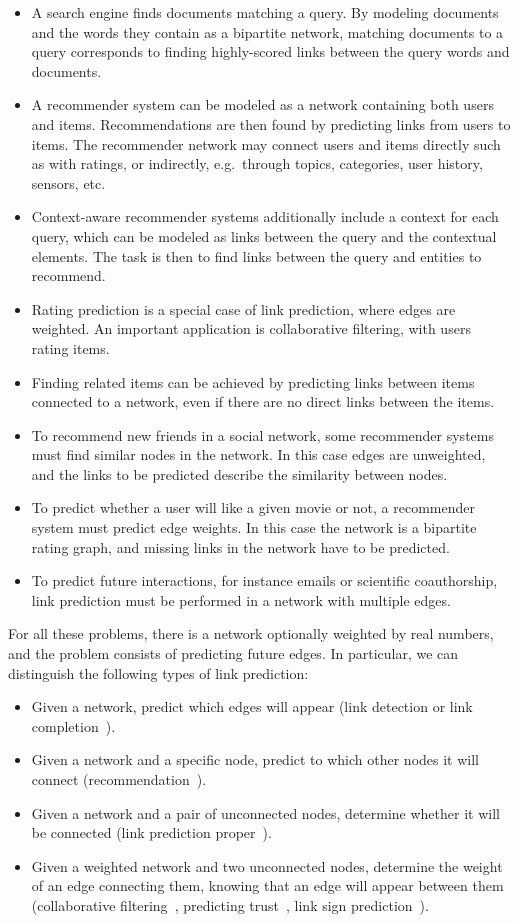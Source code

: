 \documentclass[11pt,a4paper]{book}
\begin{document}
\begin{itemize}
\item A search engine finds documents matching a query.  By modeling
  documents and the words they contain as a bipartite network, 
  matching documents to a query corresponds to finding highly-scored
  links between the query words and documents. 
\item A recommender system can be modeled as a network containing both
  users and items.  Recommendations are then found by predicting links
  from users to items.  The recommender network may connect users and
  items directly such as with ratings, or indirectly, e.g.\ through
  topics, categories, user history, sensors, etc.  
\item Context-aware recommender systems additionally include a context
  for each query, which can be modeled as links between the query and
  the contextual elements.  The task is then to find links between the
  query and entities to recommend. 
\item Rating prediction is a special case of link prediction, where
  edges are weighted.  An important application is collaborative
  filtering, with users rating items. 
\item Finding related items can be achieved by predicting links between items
  connected to a network, even if there are no direct links between the
  items. 
\item To recommend new friends in a social network, some recommender
  systems must find similar nodes in the network. 
  In this case edges are unweighted, and the links
  to be predicted describe the similarity between nodes. 
\item To predict whether a user will like a given movie or not, 
  a recommender system must predict edge weights.
  In this case the network is a bipartite
  rating graph, and missing links in the network have to be predicted. 
\item To predict future interactions, for instance emails or scientific
  coauthorship, link prediction must be performed in a
  network with multiple edges. 
\end{itemize}
For all these problems, there is a network optionally weighted by real
numbers, and the problem consists of predicting future edges.
In particular, we can distinguish the following types of link
prediction:  
\begin{itemize}
\item Given a network, predict which edges will appear 
  (link detection or link completion~\cite{b606}).
\item Given a network and a specific node, predict to which other nodes
  it will connect (recommendation~\cite{b142}).
\item Given a network and a pair of unconnected nodes, determine whether
  it will be connected (link prediction proper~\cite{b256}).
\item Given a weighted network and two unconnected nodes, determine the
  weight of an edge connecting them, knowing that an edge will appear
  between them (collaborative filtering~\cite{b25}, predicting
  trust~\cite{b325}, link sign prediction~\cite{kunegis:slashdot-zoo}). 
\end{itemize}
\end{document}
